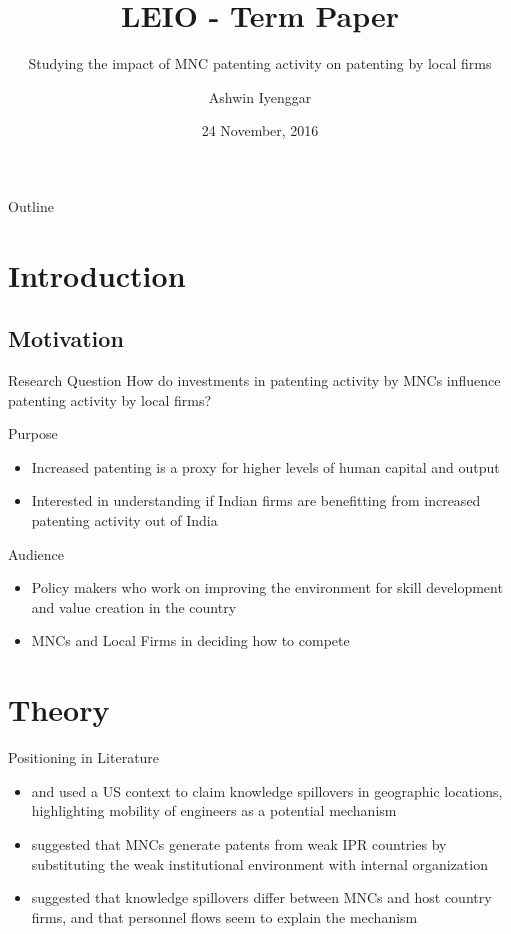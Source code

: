 \documentclass{beamer}
\title{LEIO - Term Paper}
\subtitle{Studying the impact of MNC patenting activity on patenting by local firms}
\author{Ashwin Iyenggar}
\institute[Indian Institute of Management Bangalore] 
{
  Corporate Strategy and Policy\\
  Indian Institute of Management Bangalore
}
\date{24 November, 2016}
\begin{document}
\begin{frame}
  \titlepage
\end{frame}

\begin{frame}{Outline}
  \tableofcontents
\end{frame}

\section{Introduction}
\subsection{Motivation}

\begin{frame}{Research Question}{}
How do investments in patenting activity by MNCs influence patenting activity by local firms?
\end{frame}


\begin{frame}{Purpose}{}
\begin{itemize}
\item<1->{Increased patenting is a proxy for higher levels of human capital and output}
\item<2->{Interested in understanding if Indian firms are benefitting from increased patenting activity out of India}
\end{itemize}
\end{frame}

\begin{frame}{Audience}{}
\begin{itemize}
\item<1->{Policy makers who work on improving the environment for skill development and value creation in the country}
\item<2->{MNCs and Local Firms in deciding how to compete}
\end{itemize}
\end{frame}

\section{Theory}
\begin{frame}{Positioning in Literature}{}

\begin{itemize}
\item<1->{\cite{Jaffe1993} and \cite{Almeida1999} used a US context to claim knowledge spillovers in geographic locations, highlighting mobility of engineers as a potential mechanism}
\item<2->{\cite{Zhao2006} suggested that MNCs generate patents from weak IPR countries by substituting the weak institutional environment with internal organization}
\item<3->{\cite{Singh2007} suggested that knowledge spillovers differ between MNCs and host country firms, and that personnel flows seem to explain the mechanism}
\end{itemize}
\end{frame}
\end{document}
